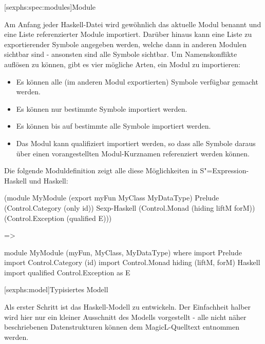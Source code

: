 \documentclass[11pt, a4paper, bibgerm]{scrbook}
\newcommand\lsection{}
\newcommand\lsubsection{}
\newcommand{\sexp}{S"=Expression}
\begin{document}
\lsubsection[sexphs:spec:modules]{Module}

Am Anfang jeder Haskell-Datei wird gewöhnlich das aktuelle Modul
benannt und eine Liste referenzierter Module importiert. Darüber
hinaus kann eine Liste zu exportierender Symbole angegeben werden,
welche dann in anderen Modulen sichtbar sind - ansonsten sind alle
Symbole sichtbar. Um Namenskonflikte auflösen zu können, gibt es vier
mögliche Arten, ein Modul zu importieren:
\begin{itemize}
\item Es können alle (im anderen Modul exportierten) Symbole verfügbar gemacht
  werden.
\item Es können nur bestimmte Symbole importiert werden.
\item Es können bis auf bestimmte alle Symbole importiert werden.
\item Das Modul kann qualifiziert importiert werden, so dass alle
  Symbole daraus über einen vorangestellten Modul-Kurznamen
  referenziert werden können.
\end{itemize}
Die folgende Moduldefinition zeigt alle diese Möglichkeiten in
\sexp{}-Haskell und Haskell:
\begin{code}
(module MyModule
  (export myFun MyClass MyDataType)
  Prelude
  (Control.Category (only id))                       Sexp-Haskell
  (Control.Monad (hiding liftM forM))
  (Control.Exception (qualified E)))

=>

module MyModule (myFun, MyClass, MyDataType) where
import Prelude
import Control.Category (id)
import Control.Monad hiding (liftM, forM)            Haskell
import qualified Control.Exception as E
\end{code}


\lsection[sexphs:model]{Typisiertes Modell}

Als erster Schritt ist das Haskell-Modell zu entwickeln. Der Einfachheit
halber wird hier nur ein kleiner Ausschnitt des Modells vorgestellt -
alle nicht näher beschriebenen Datenstrukturen können dem
MagicL-Quelltext entnommen werden.
\end{document}
